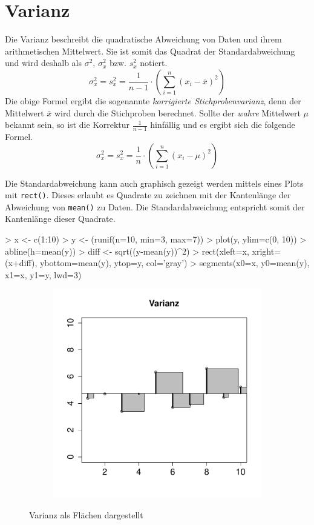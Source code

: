 \section{Varianz}\label{sec:varianz}
Die \gls{Varianz} beschreibt die quadratische Abweichung von Daten und
ihrem arithmetischen Mittelwert. Sie ist somit das Quadrat der 
Standardabweichung und wird deshalb als $\sigma^2$, $\sigma_{x}^2$ 
bzw. $s_{x}^2$ notiert.
\[
	\sigma_{x}^2 
	= s_{x}^2 
	= \frac{1}{n-1} \cdot \left(
		\sum_{i=1}^n (x_i-\bar{x})^2 
	\right)
\]
Die obige Formel ergibt die sogenannte 
\emph{korrigierte Stichprobenvarianz}, denn der Mittelwert $\bar{x}$ 
wird durch die Stichproben berechnet. Sollte der \emph{wahre} Mittelwert
$\mu$ bekannt sein, so ist die Korrektur $\frac{1}{n-1}$ hinfällig und
es ergibt sich die folgende Formel.
\[
	\sigma_{x}^2 
	= s_{x}^2 
	= \frac{1}{n} \cdot \left(
		\sum_{i=1}^n (x_i-\mu)^2 
	\right)
\]

\noindent
Die Standardabweichung kann auch graphisch gezeigt werden mittels
eines Plots mit \lstinline{rect()}. Dieses erlaubt es Quadrate zu
zeichnen mit der Kantenlänge der Abweichung von \lstinline{mean()}
zu Daten. Die Standardabweichung entspricht somit der Kantenlänge
dieser Quadrate.

\begin{Schunk}
\begin{Sinput}
> x <- c(1:10)
> y <- (runif(n=10, min=3, max=7))
> plot(y, ylim=c(0, 10))
> abline(h=mean(y))
> diff <- sqrt((y-mean(y))^2) 
> rect(xleft=x, xright=(x+diff), ybottom=mean(y), ytop=y, col='gray')
> segments(x0=x, y0=mean(y), x1=x, y1=y, lwd=3)
\end{Sinput}
\end{Schunk}


\begin{figure}[h!]
\centering
\begin{subfigure}[b]{0.48\textwidth}
\includegraphics{begriffe-006}
\end{subfigure}
\caption{Varianz als Flächen dargestellt}
\end{figure}

